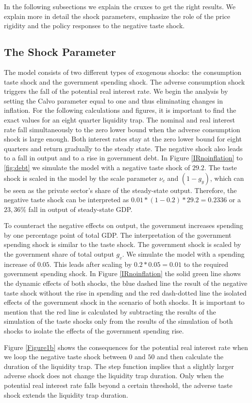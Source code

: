 \documentclass[12pt,a4paper,oneside,titlepage]{article}
\begin{document}
In the following subsections we explain the cruxes to get the right results. We explain more in detail the shock parameters, emphasize the role of the price rigidity and the policy responses to the negative taste shock.


\subsection*{The Shock Parameter}
The model consists of two different types of exogenous shocks: the consumption taste shock and the government spending shock. The adverse consumption shock triggers the fall of the potential real interest rate. We begin the analysis by setting the Calvo parameter equal to one and thus eliminating changes in inflation. For the following calculations and figures, it is important to find the exact values for an eight quarter liquidity trap. The nominal and real interest rate fall simultaneously to the zero lower bound when the adverse consumption shock is large enough. Both interest rates stay at the zero lower bound for eight quarters and return  gradually to the steady state. The negative shock also leads to a fall in output and to a rise in government debt. In Figure \ref{IRnoinflation} to \ref{fig:debt} we simulate the model with a negative taste shock of $29.2$. The taste shock is scaled in the model by the scale parameter $\nu_c$ and $\left(1- g_y\right)$, which can be seen as the private sector’s share of the steady-state output. Therefore, the negative taste shock can be interpreted as $0.01 * \left(1-0.2\right) * 29.2 = 0.2336$ or a $23,36\%$ fall in output of steady-state GDP.
\par
\bigskip
To counteract the negative effects on output, the government increases spending by one percentage point of total GDP. The interpretation of the government spending shock is similar to the taste shock.  The government shock is scaled by the government share of total output $g_v$. We simulate the model with a spending increase of $0.05$. This leads after scaling by $0.2 * 0.05 = 0.01$ to the required government spending shock.
In Figure \ref{IRnoinflation} the solid green line shows the dynamic effects of both shocks, the blue dashed line the result of the negative taste shock without the rise in spending and the red dash-dotted line the isolated effects of the government shock in the scenario of both shocks. It is important to mention that the red line is calculated by subtracting the results of the simulation of the taste shocks only from the results of the simulation of both shocks to isolate the effects of the government spending rise.
\par
\bigskip
Figure \ref{Figure1b} shows the consequences for the potential real interest rate when we loop the negative taste shock between $0$ and $50$ and then calculate the duration of the liquidity trap.
The step function implies that a slightly larger adverse shock does not change the liquidity trap duration. Only when the potential real interest rate falls beyond a certain threshold, the adverse taste shock extends the liquidity trap duration.
\end{document}
